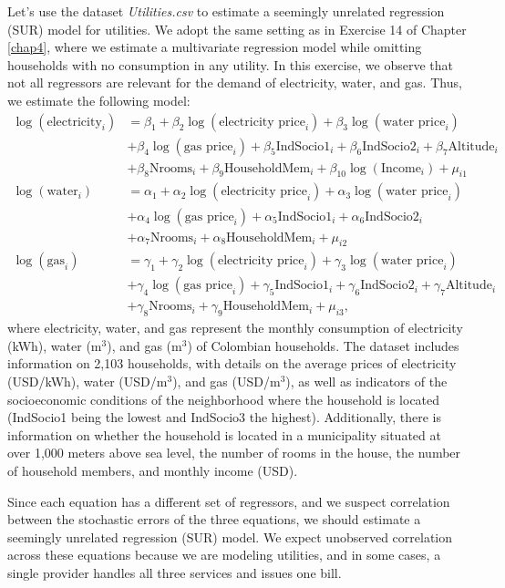 Let's use the dataset \textit{Utilities.csv} to estimate a seemingly unrelated regression (SUR) model for utilities. We adopt the same setting as in Exercise 14 of Chapter \ref{chap4}, where we estimate a multivariate regression model while omitting households with no consumption in any utility. In this exercise, we observe that not all regressors are relevant for the demand of electricity, water, and gas. Thus, we estimate the following model:
\begin{align*}
	\log(\text{electricity}_i) & = \beta_1 + \beta_2\log(\text{electricity price}_i)+\beta_3\log(\text{water price}_i)\\
	&+\beta_4\log(\text{gas price}_i)+\beta_5\text{IndSocio1}_i+\beta_6\text{IndSocio2}_i+\beta_7\text{Altitude}_i\\
	&+\beta_8\text{Nrooms}_i+\beta_9\text{HouseholdMem}_i+\beta_{10}\log(\text{Income}_i)+\mu_{i1}\\
	\log(\text{water}_i) & = \alpha_1 + \alpha_2\log(\text{electricity price}_i)+\alpha_3\log(\text{water price}_i)\\
	&+\alpha_4\log(\text{gas price}_i)+\alpha_5\text{IndSocio1}_i+\alpha_6\text{IndSocio2}_i\\
	&+\alpha_7\text{Nrooms}_i+\alpha_8\text{HouseholdMem}_i+\mu_{i2}\\
	\log(\text{gas}_i) & = \gamma_1 + \gamma_2\log(\text{electricity price}_i)+\gamma_3\log(\text{water price}_i)\\
	&+\gamma_4\log(\text{gas price}_i)+\gamma_5\text{IndSocio1}_i+\gamma_6\text{IndSocio2}_i+\gamma_7\text{Altitude}_i\\
	&+\gamma_8\text{Nrooms}_i+\gamma_9\text{HouseholdMem}_i+\mu_{i3},
\end{align*} 
where electricity, water, and gas represent the monthly consumption of electricity (kWh), water (m$^3$), and gas (m$^3$) of Colombian households. The dataset includes information on 2,103 households, with details on the average prices of electricity (USD/kWh), water (USD/m$^3$), and gas (USD/m$^3$), as well as indicators of the socioeconomic conditions of the neighborhood where the household is located (IndSocio1 being the lowest and IndSocio3 the highest). Additionally, there is information on whether the household is located in a municipality situated at over 1,000 meters above sea level, the number of rooms in the house, the number of household members, and monthly income (USD).

Since each equation has a different set of regressors, and we suspect correlation between the stochastic errors of the three equations, we should estimate a seemingly unrelated regression (SUR) model. We expect unobserved correlation across these equations because we are modeling utilities, and in some cases, a single provider handles all three services and issues one bill.

